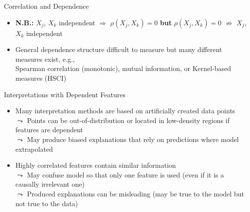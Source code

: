 \documentclass[11pt,compress,t,notes=noshow, aspectratio=169, xcolor=table]{beamer}
\begin{document}
\begin{frame}{Correlation and Dependence}
\begin{itemize}
\pause
\item \textbf{N.B.:} $X_j$, $X_k$ independent $\Rightarrow$ $\rho(X_j, X_k) = 0$ \textbf{but} $\rho(X_j, X_k) = 0$ $\nRightarrow$ $X_j$, $X_k$  independent
\item General dependence structure difficult to measure but many different measures exist, e.g., \\
Spearman correlation (monotonic), mutual information, or Kernel-based measures (HSCI)
\end{itemize}


\end{frame}



\begin{frame}{Interpretations with Dependent Features}
\begin{itemize}
\item Many interpretation methods are based on 
artificially created data points \\
$\leadsto$ Points can be out-of-distribution or located in low-density regions if features are dependent\\
$\leadsto$ May produce biased explanations that rely on predictions where model extrapolated\\
\pause
\item Highly correlated features contain similar information \\
$\leadsto$ May confuse model so that only one feature is used (even if it is a causally irrelevant one)
\\
$\leadsto$ Produced explanations can be misleading (may be true to the model but not true to the data) %
\\

\end{itemize}
\end{frame}
\end{document}
